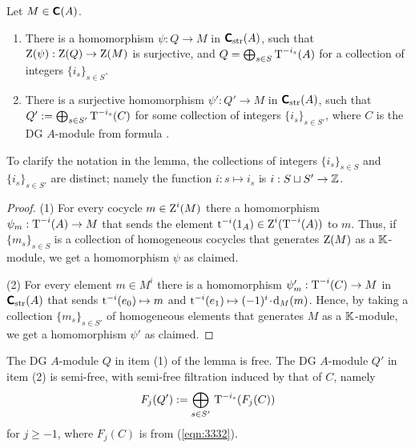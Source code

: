 \begin{lem} \label{lem:3306}
Let $M \in \boldsymbol{\mathsf{C}}(A)$.
\begin{enumerate}
\item There is a homomorphism $\psi : Q \to M$ 
in $\boldsymbol{\mathsf{C}}_{\mathrm{str}}(A)$, such that 
$\operatorname{Z}(\psi) : \operatorname{Z}(Q) \to \operatorname{Z}(M)$ is surjective,
and $Q = \bigoplus_{s \in S} \operatorname{T}^{-i_s}(A)$ 
for a collection of integers $\{ i_s \}_{s \in S}$. 

\item There is a surjective homomorphism
$\psi' : Q' \to M$ in $\boldsymbol{\mathsf{C}}_{\mathrm{str}}(A)$,
such that 
$Q' := \bigoplus_{s \in S'} \operatorname{T}^{-i_s}(C)$
for some collection of integers $\{ i_s \}_{s \in S'}$,
where $C$ is the DG $A$-module from  formula \tup{(\ref{eqn:3307})}.
\end{enumerate}
\end{lem}

To clarify the notation in the lemma, the collections of integers  
$\{ i_s \}_{s \in S}$ and $\{ i_s \}_{s \in S'}$ are distinct; namely the
function $i : s \mapsto i_s$ is $i : S \sqcup S' \to \mathbb{Z}$. 

\begin{proof} \mbox{}

\smallskip \noindent
(1) For every cocycle $m \in \operatorname{Z}^i(M)$
there a homomorphism $\psi_m : \operatorname{T}^{-i}(A) \to M$ 
that sends the element 
$\operatorname{t}^{-i}(1_A) \in \operatorname{Z}^i(\operatorname{T}^{-i}(A))$
to $m$. Thus, if $\{ m_s \}_{s \in S}$ is a collection of 
homogeneous cocycles that generates $\operatorname{Z}(M)$ as a $\mathbb{K}$-module, we get a 
homomorphism $\psi$ as claimed. 

\medskip \noindent
(2) For every element $m \in M^i$ there is a homomorphism 
$\psi'_m : \operatorname{T}^{-i}(C) \to M$ 
in $\boldsymbol{\mathsf{C}}_{\mathrm{str}}(A)$ that sends 
$\operatorname{t}^{-i}(e_0) \mapsto m$ and 
$\operatorname{t}^{-i}(e_1) \mapsto (-1)^i \mspace{1.5mu}{\cdot}\mspace{1.5mu} \mathrm{d}_M(m)$. 
Hence, by taking a collection $\{ m_s \}_{s \in S'}$ of homogeneous elements 
that  generates $M$ as a $\mathbb{K}$-module, we get a homomorphism $\psi'$ as claimed. 
\end{proof}

The DG $A$-module $Q$ in item (1) of the lemma is free. The DG $A$-module 
$Q'$ in item (2) is semi-free, with semi-free filtration induced by that of 
$C$, namely 
\begin{equation} \label{eqn:3311}
F_{j}(Q') := \bigoplus_{s \in S'} \, \operatorname{T}^{-i_s}(F_j(C))
\end{equation}
for $j \geq -1$, where $F_j(C)$ is from (\ref{eqn:3332}). 

